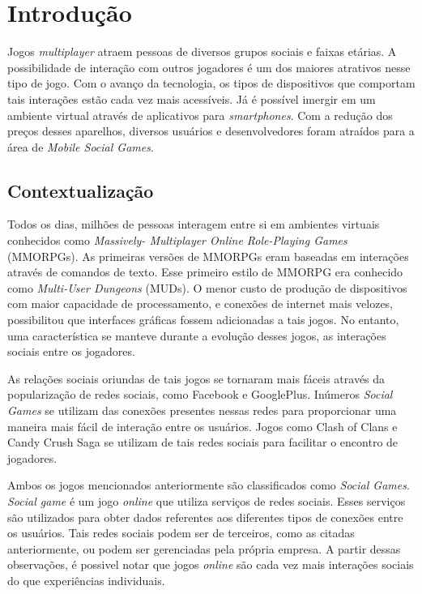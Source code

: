 \chapter[Introdução]{Introdução}

Jogos \textit{multiplayer} atraem pessoas de diversos grupos sociais e faixas etárias. A possibilidade de interação com outros jogadores
é um dos maiores atrativos nesse tipo de jogo. Com o avanço da tecnologia, os tipos de dispositivos que comportam tais interações
estão cada vez mais acessíveis. Já é possível imergir em um ambiente virtual através de aplicativos para \textit{smartphones}. Com a
redução dos preços desses aparelhos, diversos usuários e desenvolvedores foram atraídos para a área de \textit{Mobile Social Games}.

\section{Contextualização}

Todos os dias, milhões de pessoas interagem entre si em ambientes virtuais conhecidos como
\textit{Massively- Multiplayer Online Role-Playing Games} (MMORPGs)\cite{nick2006}. As primeiras versões de MMORPGs eram baseadas em
interações através de comandos de texto. Esse primeiro estilo de MMORPG era conhecido como \textit{Multi-User Dungeons} (MUDs)\cite{edward1997}.
O menor custo de produção de dispositivos com maior capacidade de processamento, e conexões de internet mais velozes,
possibilitou que interfaces gráficas fossem adicionadas a tais jogos. No entanto, uma característica se manteve durante a evolução desses jogos,
as interações sociais entre os jogadores.

As relações sociais oriundas de tais jogos se tornaram mais fáceis através da popularização de redes sociais, como Facebook e GooglePlus.
Inúmeros \textit{Social Games} se utilizam das conexões presentes nessas redes para proporcionar uma maneira mais fácil de interação entre
os usuários. Jogos como Clash of Clans\cite{clashOfClans} e Candy Crush Saga\cite{candyCrush} se utilizam de tais redes sociais para facilitar
o encontro de jogadores.

Ambos os jogos mencionados anteriormente são classificados como \textit{Social Games}. \textit{Social game} é um jogo \textit{online} que utiliza servi\c{c}os de redes sociais\cite{park2012}.
Esses serviços são utilizados para obter dados referentes aos diferentes tipos de conexões entre os usuários. Tais redes sociais podem ser de terceiros,
como as citadas anteriormente, ou podem ser gerenciadas pela própria empresa. A partir dessas observações, é possivel notar que
jogos \textit{online} são cada vez mais interações sociais do que experi\^encias individuais\cite{king2003}.

